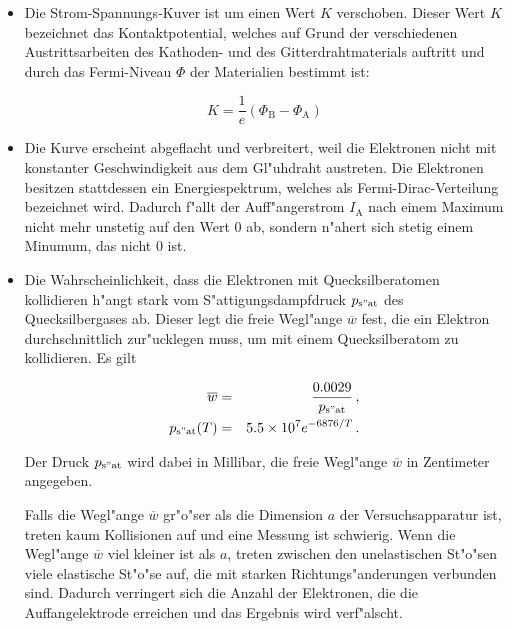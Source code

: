		\begin{itemize}
			\item Die Strom-Spannungs-Kuver ist um einen Wert $K$ verschoben.
			Dieser Wert $K$ bezeichnet das Kontaktpotential, welches auf Grund der verschiedenen Austrittsarbeiten des Kathoden- und des Gitterdrahtmaterials auftritt und durch das Fermi-Niveau $\Phi$ der Materialien bestimmt ist:

			\begin{equation*}
				K = \frac{1}{e} (\Phi_\mathrm{B} - \Phi_\mathrm{A})
			\end{equation*}

			\item Die Kurve erscheint abgeflacht und verbreitert, weil die Elektronen nicht mit konstanter Geschwindigkeit aus dem Gl"uhdraht austreten.
			Die Elektronen besitzen stattdessen ein Energiespektrum, welches als Fermi-Dirac-Verteilung bezeichnet wird.
			Dadurch f"allt der Auff"angerstrom $I_\mathrm{A}$ nach einem Maximum nicht mehr unstetig auf den Wert 0 ab, sondern n"ahert sich stetig einem Minumum, das nicht 0 ist.

			\item Die Wahrscheinlichkeit, dass die Elektronen mit Quecksilberatomen kollidieren h"angt stark vom S"attigungsdampfdruck $p_\mathrm{s"at}$ des Quecksilbergases ab.
			Dieser legt die freie Wegl"ange $\overline{w}$ fest, die ein Elektron durchschnittlich zur"ucklegen muss, um mit einem Quecksilberatom zu kollidieren.
			Es gilt

			\begin{eqnarray}
				\label{eqn:w} \overline{w} & = & \frac{\SI{.0029}{}}{p_\mathrm{s"at}} \,, \\
				\label{eqn:p} p_\mathrm{s"at}(T) & = & \SI{5.5e7}{} e^{\SI{-6876}{} / T} \,.
			\end{eqnarray}

			Der Druck $p_\mathrm{s"at}$ wird dabei in Millibar, die freie Wegl"ange $\overline{w}$ in Zentimeter angegeben.

			Falls die Wegl"ange $\overline{w}$ gr"o"ser als die Dimension $a$ der Versuchsapparatur ist, treten kaum Kollisionen auf und eine Messung ist schwierig.
			Wenn die Wegl"ange $\overline{w}$ viel kleiner ist als $a$, treten zwischen den unelastischen St"o"sen viele elastische St"o"se auf, die mit starken Richtungs"anderungen verbunden sind.
			Dadurch verringert sich die Anzahl der Elektronen, die die Auffangelektrode erreichen und das Ergebnis wird verf"alscht.
		\end{itemize}

